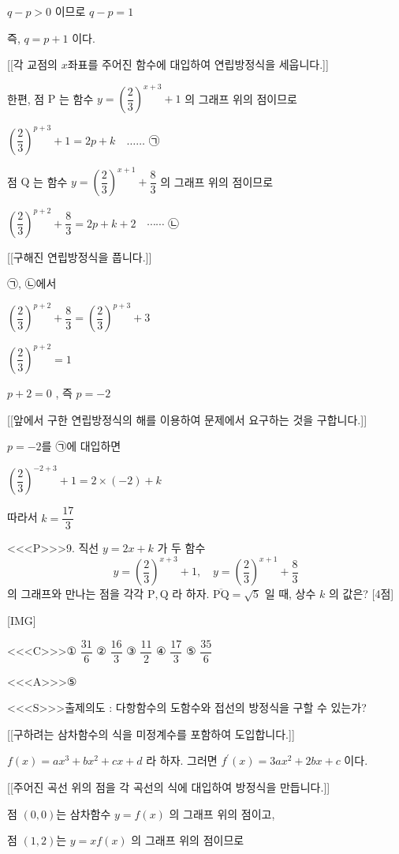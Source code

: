 \documentclass{oblivoir}
\begin{document}
$q-p>0$ 이므로 $q-p=1$

즉, $q=p+1$ 이다.

[[각 교점의 $x$좌표를 주어진 함수에 대입하여 연립방정식을 세웁니다.]]

한편, 점 $\mathrm{P}$ 는 함수 $y=\left(\dfrac{2}{3}\right)^{x+3}+1$ 의 그래프 위의 점이므로

$\left(\dfrac{2}{3}\right)^{p+3}+1=2 p+k \quad \ldots \ldots$ ㉠

점 $\mathrm{Q}$ 는 함수 $y=\left(\dfrac{2}{3}\right)^{x+1}+\dfrac{8}{3}$ 의 그래프
위의 점이므로

$\left(\dfrac{2}{3}\right)^{p+2}+\dfrac{8}{3}=2 p+k+2 \quad \cdots \cdots$ ㉡

[[구해진 연립방정식을 풉니다.]]

㉠, ㉡에서

$\left(\dfrac{2}{3}\right)^{p+2}+\dfrac{8}{3}=\left(\dfrac{2}{3}\right)^{p+3}+3$

$\left(\dfrac{2}{3}\right)^{p+2}=1$

$p+2=0$ , 즉 $p=-2$

[[앞에서 구한 연립방정식의 해를 이용하여 문제에서 요구하는 것을 구합니다.]]

$p=-2$를 ㉠에 대입하면

$\left(\dfrac{2}{3}\right)^{-2+3}+1=2 \times(-2)+k$

따라서 $k=\dfrac{17}{3}$


<<<P>>>9. 직선 $y=2 x+k$ 가 두 함수
$$
y=\left(\dfrac{2}{3}\right)^{x+3}+1, \quad y=\left(\dfrac{2}{3}\right)^{x+1}+\dfrac{8}{3}
$$
의 그래프와 만나는 점을 각각 $\mathrm{P}, \mathrm{Q}$ 라 하자. $\overline{\mathrm{PQ}}=\sqrt{5}$ 일 때, 상수 $k$ 의 값은? [4점]

[IMG]

<<<C>>>① $\dfrac{31}{6}$
② $\dfrac{16}{3}$
③ $\dfrac{11}{2}$
④ $\dfrac{17}{3}$
⑤ $\dfrac{35}{6}$


<<<A>>>⑤

<<<S>>>출제의도 : 다항함수의 도함수와 접선의 방정식을 구할 수 있는가?

[[구하려는 삼차함수의 식을 미정계수를 포함하여 도입합니다.]]

$f(x)=a x^{3}+b x^{2}+c x+d$ 라 하자. 그러면  $f^{\prime}(x)=3 a x^{2}+2 b x+c$ 이다.

[[주어진 곡선 위의 점을 각 곡선의 식에 대입하여 방정식을 만듭니다.]]

점 $(0,0)$는 삼차함수 $y=f(x)$ 의 그래프 위의 점이고,

점 $(1,2)$는 $y=x f(x)$ 의 그래프 위의 점이므로 
\end{document}
